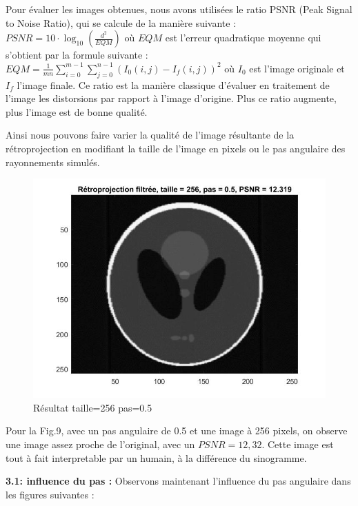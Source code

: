 \documentclass[conference]{IEEEtran}
\begin{document}
Pour évaluer les images obtenues, nous avons utilisées le ratio PSNR (Peak Signal to Noise Ratio), qui se calcule de la manière suivante :
$PSNR=10\cdot\log_{10} (\frac{d^2}{EQM})$
où $EQM$ est l'erreur quadratique moyenne qui s'obtient par la formule suivante :
$EQM=\frac{1}{mn}\sum_{i=0}^{m-1}\sum_{j=0}^{n-1}(I_0(i,j)-I_f(i,j))^2$
où $I_0$ est l'image originale et $I_f$ l'image finale.
Ce ratio est la manière classique d'évaluer en traitement de l'image les distorsions par rapport à l'image d'origine. Plus ce ratio augmente, plus l'image est de bonne qualité.

Ainsi nous pouvons faire varier la qualité de l'image résultante de la rétroprojection en modifiant la taille de l'image en pixels ou le pas angulaire des rayonnements simulés.

\begin{figure}[H]
\centering
\includegraphics[scale=0.38]{taille=256-pas=0,5}
	\caption[Résultat taille=256 pas=0.5]{Résultat taille=256 pas=0.5}
\label{fig:gallery}
\end{figure}

Pour la Fig.9, avec un pas angulaire de 0.5 et une image à 256 pixels, on observe une image assez proche de l'original, avec un $PSNR=12,32$. Cette image est tout à fait interpretable par un humain, à la différence du sinogramme.

\textbf{3.1: influence du pas :}
Observons maintenant l'influence du pas angulaire dans les figures suivantes :
\end{document}
